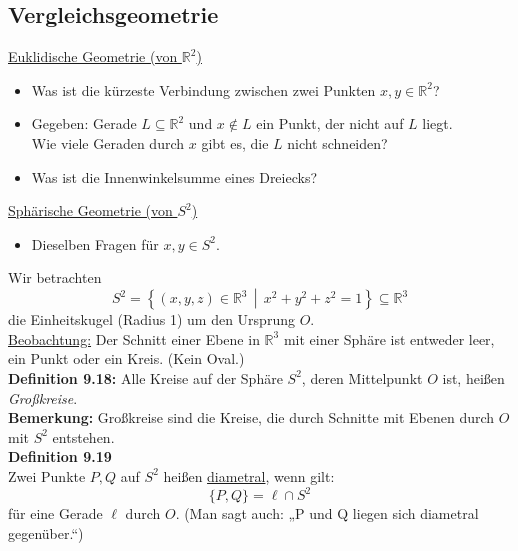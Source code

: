 \documentclass[fleqn, 12pt, letterpaper]{article}
\begin{document}
\subsection{Vergleichsgeometrie}

\underline{Euklidische Geometrie (von $\mathbb{R}^2$)}

\begin{itemize}
    \item Was ist die kürzeste Verbindung zwischen zwei Punkten $x, y \in \mathbb{R}^2$?
    
    \item Gegeben: Gerade $L \subseteq \mathbb{R}^2$ und $x \notin L$ ein Punkt, der nicht auf $L$ liegt. \\
    Wie viele Geraden durch $x$ gibt es, die $L$ nicht schneiden?
    
    \item Was ist die Innenwinkelsumme eines Dreiecks?
\end{itemize}

\underline{Sphärische Geometrie (von $S^2$)}

\begin{itemize}
    \item Dieselben Fragen für $x, y \in S^2$.
\end{itemize}


Wir betrachten
\[
S^2 = \left\{ (x, y, z) \in \mathbb{R}^3 \,\middle|\, x^2 + y^2 + z^2 = 1 \right\} \subseteq \mathbb{R}^3
\]
die Einheitskugel (Radius 1) um den Ursprung \( O \).\\

\underline{Beobachtung:}
Der Schnitt einer Ebene in \( \mathbb{R}^3 \) mit einer Sphäre ist entweder leer, ein Punkt oder ein Kreis. (Kein Oval.)\\


\textbf{Definition 9.18:}
Alle Kreise auf der Sphäre \( S^2 \), deren Mittelpunkt \( O \) ist, heißen \emph{Großkreise}.\\

\textbf{Bemerkung:}
Großkreise sind die Kreise, die durch Schnitte mit Ebenen durch \( O \) mit \( S^2 \) entstehen.\\

\textbf{Definition 9.19}\\
Zwei Punkte \( P, Q \) auf \( S^2 \) heißen \underline{diametral}, wenn gilt:
\[
\{P, Q\} = \ell \cap S^2
\]
für eine Gerade \( \ell \) durch \( O \). (Man sagt auch: „P und Q liegen sich diametral gegenüber.“)\\
\end{document}
